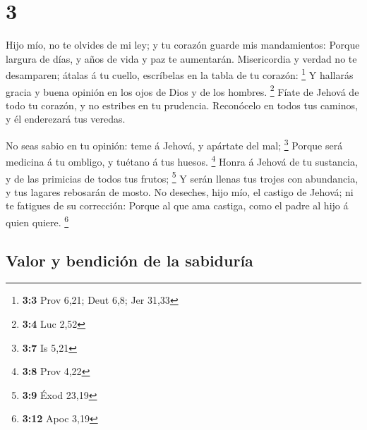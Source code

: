 \hypertarget{section-2}{%
\section{3}\label{section-2}}

 Hijo mío, no te olvides de mi ley; y tu corazón guarde
mis mandamientos:  Porque largura de días, y años de vida
y paz te aumentarán.  Misericordia y verdad no te
desamparen; átalas á tu cuello, escríbelas en la tabla de tu corazón:
\footnote{\textbf{3:3} Prov 6,21; Deut 6,8; Jer 31,33}  Y
hallarás gracia y buena opinión en los ojos de Dios y de los hombres.
\footnote{\textbf{3:4} Luc 2,52}  Fíate de Jehová de todo
tu corazón, y no estribes en tu prudencia.  Reconócelo en
todos tus caminos, y él enderezará tus veredas.

 No seas sabio en tu opinión: teme á Jehová, y apártate
del mal; \footnote{\textbf{3:7} Is 5,21}  Porque será
medicina á tu ombligo, y tuétano á tus huesos. \footnote{\textbf{3:8}
  Prov 4,22}  Honra á Jehová de tu sustancia, y de las
primicias de todos tus frutos; \footnote{\textbf{3:9} Éxod 23,19}
 Y serán llenas tus trojes con abundancia, y tus lagares
rebosarán de mosto.  No deseches, hijo mío, el castigo de
Jehová; ni te fatigues de su corrección:  Porque al que
ama castiga, como el padre al hijo á quien quiere. \footnote{\textbf{3:12}
  Apoc 3,19}

\hypertarget{valor-y-bendiciuxf3n-de-la-sabiduruxeda}{%
\subsection{Valor y bendición de la
sabiduría}\label{valor-y-bendiciuxf3n-de-la-sabiduruxeda}}

